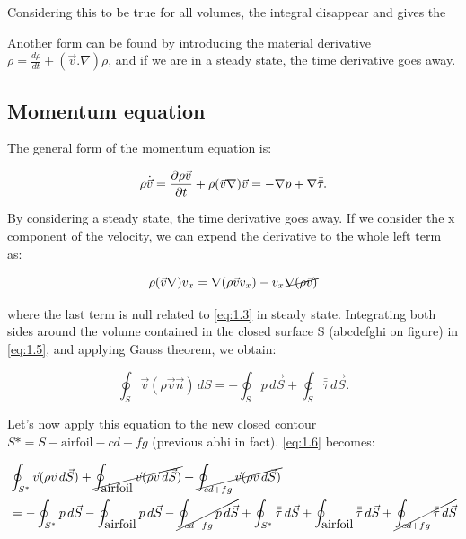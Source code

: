 		Considering this to be true for all volumes, the integral disappear and gives the 
		
		\begin{center}
		\end{center}
		
		Another form can be found by introducing the material derivative $\dot{\rho} = \frac{d\rho}{dt} + (\vec{v}.\nabla )\rho$, and if we are in a steady state, the time derivative goes away. 
		
	\subsection{Momentum equation}
		The general form of the momentum equation is: 
		
		\begin{equation}
		\rho \dot{\vec{v}} = \frac{\partial \rho \vec{v}}{\partial t} + \rho (\vec{v}\nabla ) \vec{v} = -\nabla p + \nabla \bar{\bar{\tau}}.
		\end{equation}
		
		By considering a steady state, the time derivative goes away. If we consider the x component of the velocity, we can expend the derivative to the whole left term as:
		
		\begin{equation}
		\rho (\vec{v}\nabla ) v_x = \nabla (\rho \vec{v} v_x) - v_x \cancel{\nabla (\rho \vec{v})}
		\label{eq:1.5}
		\end{equation}
		
		where the last term is null related to \eqref{eq:1.3} in steady state. Integrating both sides around the volume contained in the closed surface S (abcdefghi on figure) in \eqref{eq:1.5}, and applying Gauss theorem, we obtain:
		
		\begin{equation}
		\oint _{S} \vec{v} (\rho \vec{v} \vec{n}) \, dS = -\oint _{S} p \, d\vec{S} + \oint _{S} \bar{\bar{\tau}} \, d\vec{S}.
		\label{eq:1.6}
		\end{equation}		 
		
		Let's now apply this equation to the new closed contour $S* = S - \mbox{airfoil} - cd - fg$ (previous abhi in fact). \eqref{eq:1.6} becomes:
		
		\begin{equation}
		\begin{aligned}
		&\oint _{S^*} \vec{v} (\rho \vec{v} \, d\vec{S})  + \cancel{\oint _{\mbox{airfoil}} \vec{v} (\rho \vec{v} \, d\vec{S})} + \cancel{\oint _{cd+fg} \vec{v} (\rho \vec{v} \, d\vec{S})} 
		\\&= -\oint _{S^*} p \, d\vec{S} -\oint _{\mbox{airfoil}} p \, d\vec{S}-\cancel{\oint _{cd + fg} p \, d\vec{S}}+ \oint _{S^*} \bar{\bar{\tau}} \, d\vec{S} +\oint _{\mbox{airfoil}} \bar{\bar{\tau}}\, d\vec{S} +\cancel{\oint _{cd + fg} \bar{\bar{\tau}}\, d\vec{S}}
		\end{aligned}
		\label{eq:1.7}
		\end{equation}
		
